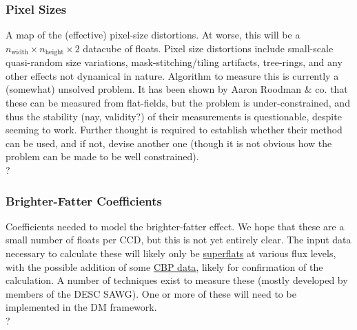 \subsubsection{Pixel Sizes}\label{sec:CPP:output:pixelSizeMap} \xxx 
A map of the (effective) pixel-size distortions. At worse, this will be a $n_{\mbox{width}}\times n_{\mbox{height}}\times 2$ datacube of floats. Pixel size distortions include small-scale quasi-random size variations, mask-stitching/tiling artifacts, tree-rings, and any other effects not dynamical in nature.
\alg Algorithm to measure this is currently a (somewhat) unsolved problem. It has been shown by Aaron Roodman \& co. that these can be measured from flat-fields, but the problem is under-constrained, and thus the stability (nay, validity?) of their measurements is questionable, despite seeming to work. Further thought is required to establish whether their method can be used, and if not, devise another one (though it is not obvious how the problem can be made to be well constrained). 
\\ \dragons ?


\subsubsection{Brighter-Fatter Coefficients}\label{sec:CPP:output:brighterFatterCoeffs}
Coefficients needed to model the brighter-fatter effect. We hope that these are a small number of floats per CCD, but this is not yet entirely clear. The input data necessary to calculate these will likely only be \hyperref[sec:CPP:inputs:broadFlat]{superflats} at various flux levels, with the possible addition of some \hyperref[sec:CPP:inputs:CBP]{CBP data}, likely for confirmation of the calculation.
\alg A number of techniques exist to measure these (mostly developed by members of the DESC SAWG). One or more of these will need to be implemented in the DM framework. 
\\ \dragons ?


